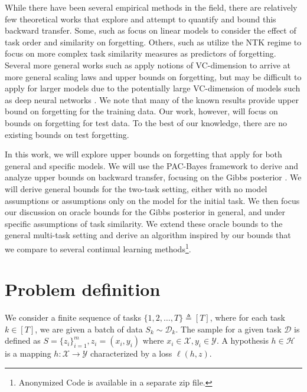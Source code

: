 \documentclass{article}
\theoremstyle{plain}
\theoremstyle{definition}
\theoremstyle{remark}
\newcommand{\RM}[1]{{\textcolor{magenta}{#1}}}
\begin{document}
While there have been several empirical methods in the field, there are relatively few theoretical works that explore and attempt to quantify and bound this backward transfer. Some, such as \citet{evron2022catastrophic, lin2023theory} focus on linear models to consider the effect of task order and similarity on forgetting. Others, such as \citet{bennani2020generalisation, doan2021theoretical} utilize the NTK regime to focus on more complex task similarity measures as predictors of forgetting.
Several more general works such as \citet{benavides2022theory} apply notions of VC-dimension to arrive at more general scaling laws and upper bounds on forgetting, but may be difficult to apply for larger models due to the potentially large VC-dimension of models such as deep neural networks \citep{bartlett2019nearly}. %
We note that many of the known results \citep{bennani2020generalisation, evron2022catastrophic,  benavides2022theory} provide upper bound on forgetting for the training data. Our work, however, will focus on bounds on forgetting for test data. To the best of our knowledge, there are no existing bounds on test forgetting.

In this work, we will explore upper bounds on forgetting that apply for both general and specific models. We will use the PAC-Bayes \cite{Mcallester, Catoni2004, alquier2021user} %
framework to derive and analyze upper bounds on backward transfer, focusing on the Gibbs posterior \citep{casella1992explaining}. We will derive general bounds for the two-task setting, either with no model assumptions or assumptions only on the model for the initial task. We then focus our discussion on oracle bounds for the Gibbs posterior in general, and under specific assumptions of task similarity. We extend these oracle bounds to the general multi-task setting and derive an algorithm inspired by our bounds that we compare to several continual learning methods\footnote{Anonymized Code is  available in a separate zip file.}.

\section{Problem definition}
%
We consider a finite sequence of tasks $\{1,2,\ldots,T\}\triangleq [T]$, where for each task $k\in[T]$, we are given a batch of data  $S_k\sim \mathcal{D}_k$. 
The sample for a given task $\mathcal{D}$ is defined as $S=\{z_i\}_{i=1}^m, z_i=(x_i,y_i)$ where $x_i\in \mathcal{X}, y_i\in \mathcal{Y}$.
 A hypothesis $h\in \mathcal{H}$ is a mapping $h:\mathcal{X}\rightarrow \mathcal{Y}$  characterized by a loss $\ell(h,z)$.
\end{document}

